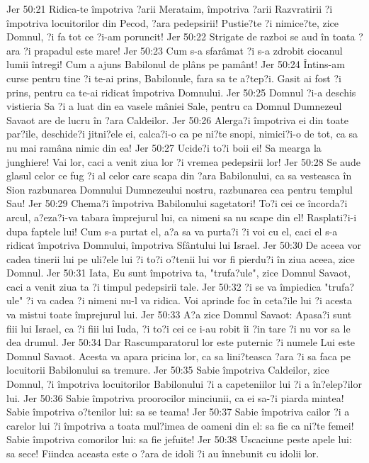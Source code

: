 Jer 50:21  Ridica-te împotriva ?arii Merataim, împotriva ?arii Razvratirii ?i împotriva locuitorilor din Pecod, ?ara pedepsirii! Pustie?te ?i nimice?te, zice Domnul, ?i fa tot ce ?i-am poruncit!
Jer 50:22  Strigate de razboi se aud în toata ?ara ?i prapadul este mare!
Jer 50:23  Cum s-a sfarâmat ?i s-a zdrobit ciocanul lumii întregi! Cum a ajuns Babilonul de plâns pe pamânt!
Jer 50:24  Întins-am curse pentru tine ?i te-ai prins, Babilonule, fara sa te a?tep?i. Gasit ai fost ?i prins, pentru ca te-ai ridicat împotriva Domnului.
Jer 50:25  Domnul ?i-a deschis vistieria Sa ?i a luat din ea vasele mâniei Sale, pentru ca Domnul Dumnezeul Savaot are de lucru în ?ara Caldeilor.
Jer 50:26  Alerga?i împotriva ei din toate par?ile, deschide?i jitni?ele ei, calca?i-o ca pe ni?te snopi, nimici?i-o de tot, ca sa nu mai ramâna nimic din ea!
Jer 50:27  Ucide?i to?i boii ei! Sa mearga la junghiere! Vai lor, caci a venit ziua lor ?i vremea pedepsirii lor!
Jer 50:28  Se aude glasul celor ce fug ?i al celor care scapa din ?ara Babilonului, ca sa vesteasca în Sion razbunarea Domnului Dumnezeului nostru, razbunarea cea pentru templul Sau!
Jer 50:29  Chema?i împotriva Babilonului sagetatori! To?i cei ce încorda?i arcul, a?eza?i-va tabara împrejurul lui, ca nimeni sa nu scape din el! Rasplati?i-i dupa faptele lui! Cum s-a purtat el, a?a sa va purta?i ?i voi cu el, caci el s-a ridicat împotriva Domnului, împotriva Sfântului lui Israel.
Jer 50:30  De aceea vor cadea tinerii lui pe uli?ele lui ?i to?i o?tenii lui vor fi pierdu?i în ziua aceea, zice Domnul.
Jer 50:31  Iata, Eu sunt împotriva ta, "trufa?ule", zice Domnul Savaot, caci a venit ziua ta ?i timpul pedepsirii tale.
Jer 50:32  ?i se va împiedica "trufa?ule" ?i va cadea ?i nimeni nu-l va ridica. Voi aprinde foc în ceta?ile lui ?i acesta va mistui toate împrejurul lui.
Jer 50:33  A?a zice Domnul Savaot: Apasa?i sunt fiii lui Israel, ca ?i fiii lui Iuda, ?i to?i cei ce i-au robit îi ?in tare ?i nu vor sa le dea drumul.
Jer 50:34  Dar Rascumparatorul lor este puternic ?i numele Lui este Domnul Savaot. Acesta va apara pricina lor, ca sa lini?teasca ?ara ?i sa faca pe locuitorii Babilonului sa tremure.
Jer 50:35  Sabie împotriva Caldeilor, zice Domnul, ?i împotriva locuitorilor Babilonului ?i a capeteniilor lui ?i a în?elep?ilor lui.
Jer 50:36  Sabie împotriva proorocilor minciunii, ca ei sa-?i piarda mintea! Sabie împotriva o?tenilor lui: sa se teama!
Jer 50:37  Sabie împotriva cailor ?i a carelor lui ?i împotriva a toata mul?imea de oameni din el: sa fie ca ni?te femei! Sabie împotriva comorilor lui: sa fie jefuite!
Jer 50:38  Uscaciune peste apele lui: sa sece! Fiindca aceasta este o ?ara de idoli ?i au înnebunit cu idolii lor.
